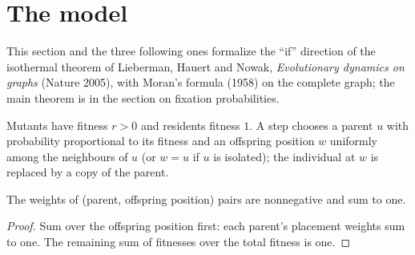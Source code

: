 \begin{abstract}
We formalize the Birth--death Moran process on a finite graph and the ``if'' direction of the
isothermal theorem of Lieberman, Hauert and Nowak (2005): on a connected regular graph, a
mutant population of size $k$ with fitness $r\neq 1$ takes over the whole population with
probability $(1-r^{-k})/(1-r^{-n})$, and with probability $k/n$ when $r=1$. The complete graph
gives Moran's formula (1958). As in the voter project, eventual probabilities are suprema of
increasing finite-time probabilities; no path-space measure is used.
\end{abstract}

\section{The model}\label{sec:lhn-isothermal}
This section and the three following ones formalize the ``if'' direction of the isothermal
theorem of Lieberman, Hauert and Nowak, \emph{Evolutionary dynamics on graphs} (Nature 2005),
with Moran's formula (1958) on the complete graph; the main theorem is in the section on fixation
probabilities.
\begin{definition}\label{def:moran}
\leanok
Mutants have fitness $r>0$ and residents fitness $1$. A step chooses a parent $u$ with
probability proportional to its fitness and an offspring position $w$ uniformly among the
neighbours of $u$ (or $w=u$ if $u$ is isolated); the individual at $w$ is replaced by a copy
of the parent.
\end{definition}
\begin{lemma}\label{lem:well-defined}
\leanok{}
The weights of (parent, offspring position) pairs are nonnegative and sum to one.
\end{lemma}
\begin{proof}\leanok
Sum over the offspring position first: each parent's placement weights sum to one.
The remaining sum of fitnesses over the total fitness is one.
\end{proof}


